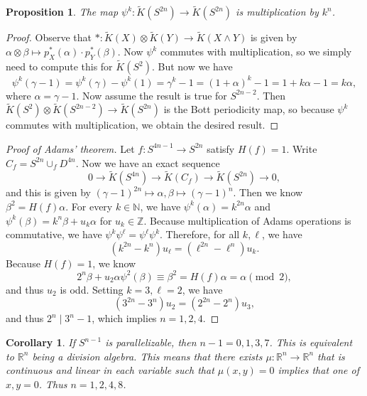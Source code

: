 \documentclass[leqno, openany]{memoir}
\newtheorem{cor}[thm]{Corollary}
\newtheorem{prop}[thm]{Proposition}
\theoremstyle{definition}
\theoremstyle{remark}
\theoremstyle{plain}
\theoremstyle{definition}
\theoremstyle{remark}
\newcommand{\N}{\mathbb{N}}
\newcommand{\R}{\mathbb{R}}
\newcommand{\Z}{\mathbb{Z}}
\newcommand{\wt}[1]{\widetilde{#1}}
\begin{document}
\begin{prop} The map $\psi^k \colon \wt{K}(S^{2n}) \to \wt{K}(S^{2n})$ is
multiplication by $k^n$.  \end{prop}

\begin{proof} Observe that $* \colon \wt{K}(X) \otimes \wt{K}(Y) \to \wt{K}(X
    \wedge Y)$ is given by $\alpha \otimes \beta \mapsto p_X^*(\alpha) \cdot
    p_Y^*(\beta)$. Now $\psi^k$ commutes with multiplication, so we simply need
    to compute this for $\wt{K}(S^2)$. But now we have \[ \psi^k(\gamma - 1) =
    \psi^k(\gamma) - \psi^k(1) = \gamma^k - 1 = { (1+\alpha) }^k - 1 = 1 +
k\alpha - 1 = k \alpha, \] where $\alpha = \gamma - 1$. Now assume the result
is true for $S^{2n-2}$. Then $\wt{K}(S^2) \otimes \wt{K}(S^{2n-2}) \to
\wt{K}(S^{2n})$ is the Bott periodicity map, so because $\psi^k$ commutes with
multiplication, we obtain the desired result.  \end{proof}

\begin{proof}[Proof of Adams' theorem] Let $f \colon S^{4n-1} \to S^{2n}$
    satisfy $H(f) = 1$. Write $C_f = S^{2n} \cup_f D^{4n}$. Now we have an
    exact sequence \[ 0 \to \wt{K}(S^{4n}) \to \wt{K}(C_f) \to \wt{K}(S^{2n})
    \to 0, \] and this is given by ${(\gamma-1)}^{2n} \mapsto \alpha, \beta
    \mapsto {(\gamma-1)}^n$. Then we know $\beta^2 = H(f) \alpha$. For every $k
    \in \N$, we have $\psi^k(\alpha) = k^{2n} \alpha$ and $\psi^k(\beta) = k^n
    \beta + u_k \alpha$ for $u_k \in \Z$. Because multiplication of Adams
    operations is commutative, we have $\psi^k \psi^{\ell} = \psi^{\ell}
    \psi^k$. Therefore, for all $k, \ell$, we have \[ (k^{2n}-k^n) u_{\ell} =
        (\ell^{2n} - \ell^n) u_k. \] Because $H(f) = 1$, we know \[ 2^n \beta +
    u_2 \alpha \psi^2(\beta) \equiv \beta^2 = H(f) \alpha = \alpha \pmod{2}, \]
    and thus $u_2$ is odd. Setting $k=3, \ell=2$, we have \[ (3^{2n} - 3^n) u_2
    = (2^{2n} - 2^n) u_3, \] and thus $2^n \mid 3^n - 1$, which implies $n =
1,2,4$.  \end{proof}

\begin{cor} If $S^{n-1}$ is parallelizable, then $n - 1 = 0,1,3,7$. This is
    equivalent to $\R^n$ being a division algebra. This means that there exists
    $\mu \colon \R^n \to \R^n$ that is continuous and linear in each variable
    such that $\mu(x,y) = 0$ implies that one of $x,y = 0$. Thus $n=1,2,4,8$.
\end{cor}
\end{document}
